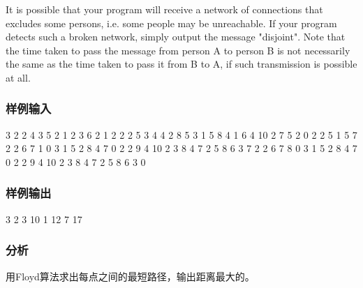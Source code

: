 It is possible that your program will receive a network of connections that excludes some persons, i.e. some people may be unreachable. If your program detects such a broken network, simply output the message "disjoint". Note that the time taken to pass the message from person A to person B is not necessarily the same as the time taken to pass it from B to A, if such transmission is possible at all.

\subsubsection{样例输入}
\begin{Code}
3
2 2 4 3 5
2 1 2 3 6
2 1 2 2 2
5
3 4 4 2 8 5 3
1 5 8
4 1 6 4 10 2 7 5 2
0
2 2 5 1 5
7        
2 2 6 7 1
0  
3 1 5 2 8 4 7
0
2 2 9 4 10
2 3 8 4 7
2 5 8 6 3
7        
2 2 6 7 8
0  
3 1 5 2 8 4 7
0
2 2 9 4 10
2 3 8 4 7
2 5 8 6 3
0
\end{Code}

\subsubsection{样例输出}
\begin{Code}
3 2  
3 10
1 12
7 17
\end{Code}

\subsubsection{分析}
用Floyd算法求出每点之间的最短路径，输出距离最大的。


